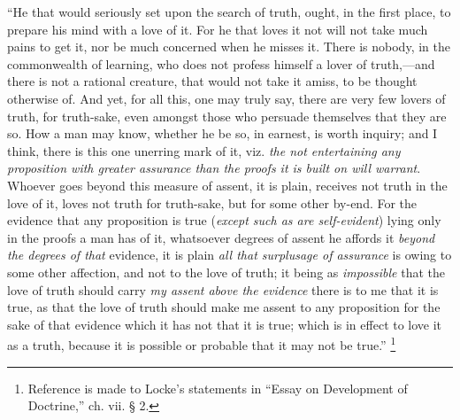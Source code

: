 ``He that would seriously set upon the search of truth, ought,
in the first place, to prepare his mind with a love of it. For he that
loves it not will not take much pains to get it, nor be much concerned
when he misses it. There is nobody, in the commonwealth of learning,
who does not profess himself a lover of truth,—and there is not a
rational creature, that would not take it amiss, to be thought
otherwise of. And yet, for all this, one may truly say, there are very
few lovers of truth, for truth-sake, even amongst those who persuade
themselves that they are so. How a man may know, whether he be so, in
earnest, is worth inquiry; and I think, there is this one unerring
mark of it, viz. \emph{the not entertaining any proposition with greater
assurance than the proofs it is built on will warrant}. Whoever
goes beyond this measure of assent, it is plain, receives not
truth in the love of it, loves not truth for truth-sake, but for some
other by-end. For the evidence that any proposition is true (\emph{except
such as are self-evident}) lying only in the proofs a man has of
it, whatsoever degrees of assent he affords it \emph{beyond the degrees
of that} evidence, it is plain \emph{all that surplusage of assurance}
is owing to some other affection, and not to the love of truth; it
being as \emph{impossible} that the love of truth should carry \emph{my
assent above the evidence} there is to me that it is true, as that
the love of truth should make me assent to any proposition for the
sake of that evidence which it has not that it is true; which is in
effect to love it as a truth, because it is possible or probable that
it may not be true.'' \footnote{Reference is made to Locke's statements in ``Essay on
Development of Doctrine,'' ch. vii. § 2.}

